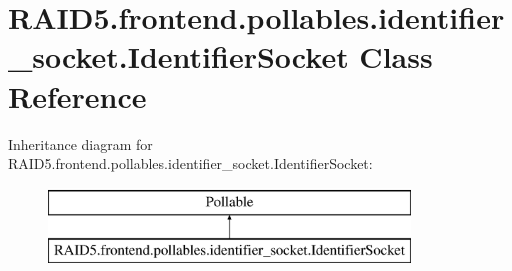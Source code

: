 \hypertarget{class_r_a_i_d5_1_1frontend_1_1pollables_1_1identifier__socket_1_1_identifier_socket}{}\section{R\+A\+I\+D5.\+frontend.\+pollables.\+identifier\+\_\+socket.\+Identifier\+Socket Class Reference}
\label{class_r_a_i_d5_1_1frontend_1_1pollables_1_1identifier__socket_1_1_identifier_socket}
Inheritance diagram for R\+A\+I\+D5.\+frontend.\+pollables.\+identifier\+\_\+socket.\+Identifier\+Socket\+:\begin{figure}[H]
\begin{center}
\leavevmode
\includegraphics[height=2.000000cm]{class_r_a_i_d5_1_1frontend_1_1pollables_1_1identifier__socket_1_1_identifier_socket}
\end{center}
\end{figure}
